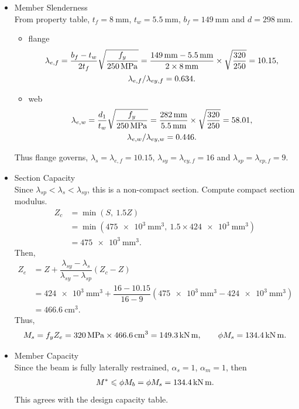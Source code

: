 \begin{solution}
\begin{itemize}
\item Member Slenderness\\
From property table, $t_f=\SI{8}{\mm}$, $t_w=\SI{5.5}{\mm}$, $b_f=\SI{149}{\mm}$ and $d=\SI{298}{\mm}$.
\begin{itemize}
\item flange
\begin{gather*}
\lambda_{e,f}=\dfrac{b_f-t_w}{2t_f}\sqrt{\dfrac{f_y}{\SI{250}{\mega\pascal}}}=\dfrac{\SI{149}{\milli\meter}-\SI{5.5}{\milli\meter}}{2\times\SI{8}{\milli\meter}}\times\sqrt{\dfrac{320}{250}}=10.15,\\\lambda_{e,f}/\lambda_{ey,f}=0.634.
\end{gather*}
\item web
\begin{gather*}
\lambda_{e,w}=\dfrac{d_1}{t_w}\sqrt{\dfrac{f_y}{\SI{250}{\mega\pascal}}}=\dfrac{\SI{282}{\milli\meter}}{\SI{5.5}{\milli\meter}}\times\sqrt{\dfrac{320}{250}}=58.01,\\\lambda_{e,w}/\lambda_{ey,w}=0.446.
\end{gather*}
\end{itemize}
Thus flange governs, $\lambda_s=\lambda_{e,f}=10.15$, $\lambda_{sy}=\lambda_{ey,f}=16$ and $\lambda_{sp}=\lambda_{ep,f}=9$.
\item Section Capacity\\
Since $\lambda_{sp}<\lambda_s<\lambda_{sy}$, this is a non-compact section.
Compute compact section modulus.
\begin{align*}
Z_c&=\min\left(S,~1.5Z\right)\\&=\min\left(\SI{475e3}{\mm^3},~1.5\times\SI{424e3}{\mm^3}\right)\\&=\SI{475e3}{\mm^3}.
\end{align*}
Then,
\begin{align*}
Z_e&=Z+\dfrac{\lambda_{sy}-\lambda_s}{\lambda_{sy}-\lambda_{sp}}\left(Z_c-Z\right)\\&=\SI{424e3}{\mm^3}+\dfrac{16-10.15}{16-9}\left(\SI{475e3}{\mm^3}-\SI{424e3}{\mm^3}\right)\\&=\SI{466.6}{\cm^3}.
\end{align*}
Thus,
\begin{gather*}
M_s=f_yZ_e=\SI{320}{\mega\pascal}\times\SI{466.6}{\centi\meter^3}=\SI{149.3}{\kilo\newton\meter},\qquad\phi{}M_s=\SI{134.4}{\kilo\newton\meter}.
\end{gather*}
\item Member Capacity\\
Since the beam is fully laterally restrained, $\alpha_s=1$, $\alpha_m=1$, then
\begin{gather*}
M^*\leqslant\phi{}M_b=\phi{}M_s=\SI{134.4}{\kilo\newton\meter}.
\end{gather*}
This agrees with the design capacity table.
\end{itemize}
\end{solution}

